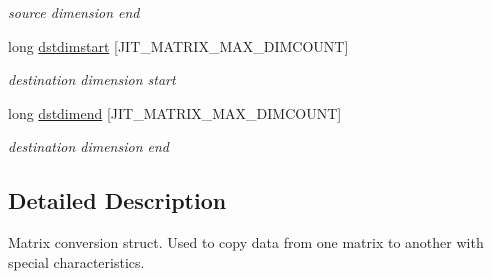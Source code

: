 \begin{DoxyCompactItemize}
\begin{DoxyCompactList}\small\item\em source dimension end \item\end{DoxyCompactList}\item 
\hypertarget{structt__matrix__conv__info_a339262ad8b13129d56f426e068da8082}{
long \hyperlink{structt__matrix__conv__info_a339262ad8b13129d56f426e068da8082}{dstdimstart} \mbox{[}JIT\_\-MATRIX\_\-MAX\_\-DIMCOUNT\mbox{]}}
\label{structt__matrix__conv__info_a339262ad8b13129d56f426e068da8082}

\begin{DoxyCompactList}\small\item\em destination dimension start \item\end{DoxyCompactList}\item 
\hypertarget{structt__matrix__conv__info_add68cbb129b01acba35db33825fbe74a}{
long \hyperlink{structt__matrix__conv__info_add68cbb129b01acba35db33825fbe74a}{dstdimend} \mbox{[}JIT\_\-MATRIX\_\-MAX\_\-DIMCOUNT\mbox{]}}
\label{structt__matrix__conv__info_add68cbb129b01acba35db33825fbe74a}

\begin{DoxyCompactList}\small\item\em destination dimension end \item\end{DoxyCompactList}\end{DoxyCompactItemize}


\subsection{Detailed Description}
Matrix conversion struct. Used to copy data from one matrix to another with special characteristics. 